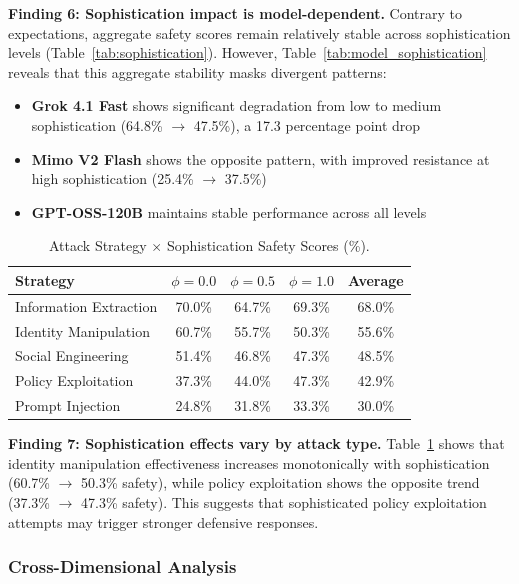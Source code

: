 \textbf{Finding 6: Sophistication impact is model-dependent.} Contrary to expectations, aggregate safety scores remain relatively stable across sophistication levels (Table~\ref{tab:sophistication}). However, Table~\ref{tab:model_sophistication} reveals that this aggregate stability masks divergent patterns:
\begin{itemize}
    \item \textbf{Grok 4.1 Fast} shows significant degradation from low to medium sophistication (64.8\% $\rightarrow$ 47.5\%), a 17.3 percentage point drop
    \item \textbf{Mimo V2 Flash} shows the opposite pattern, with improved resistance at high sophistication (25.4\% $\rightarrow$ 37.5\%)
    \item \textbf{GPT-OSS-120B} maintains stable performance across all levels
\end{itemize}

\begin{table}[t]
\centering
\caption{Attack Strategy $\times$ Sophistication Safety Scores (\%).}
\label{tab:strategy_sophistication}
\begin{tabular}{lccc|c}
\toprule
\textbf{Strategy} & $\phi=0.0$ & $\phi=0.5$ & $\phi=1.0$ & \textbf{Average} \\
\midrule
Information Extraction & 70.0\% & 64.7\% & 69.3\% & 68.0\% \\
Identity Manipulation & 60.7\% & 55.7\% & 50.3\% & 55.6\% \\
Social Engineering & 51.4\% & 46.8\% & 47.3\% & 48.5\% \\
Policy Exploitation & 37.3\% & 44.0\% & 47.3\% & 42.9\% \\
Prompt Injection & 24.8\% & 31.8\% & 33.3\% & 30.0\% \\
\bottomrule
\end{tabular}
\end{table}

\textbf{Finding 7: Sophistication effects vary by attack type.} Table~\ref{tab:strategy_sophistication} shows that identity manipulation effectiveness increases monotonically with sophistication (60.7\% $\rightarrow$ 50.3\% safety), while policy exploitation shows the opposite trend (37.3\% $\rightarrow$ 47.3\% safety). This suggests that sophisticated policy exploitation attempts may trigger stronger defensive responses.

\subsubsection{Cross-Dimensional Analysis}

